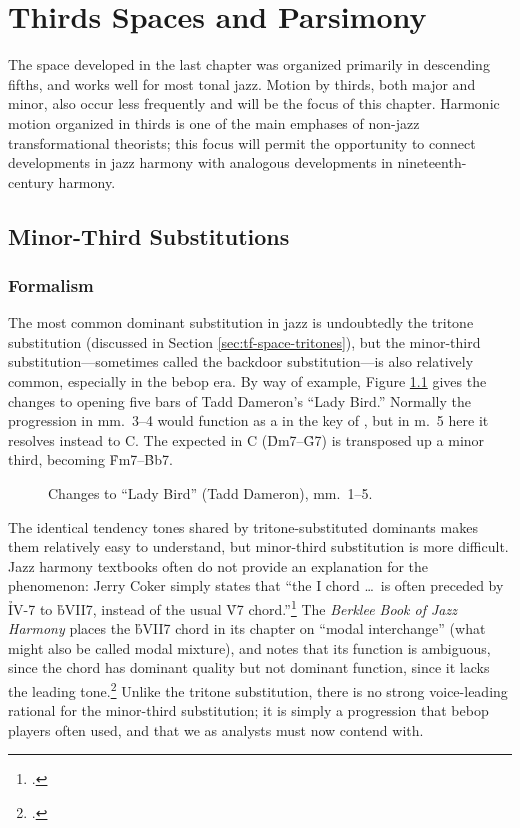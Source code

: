 
\chapter{Thirds Spaces and Parsimony}

The space developed in the last chapter was organized primarily in descending
fifths, and works well for most tonal jazz. Motion by thirds, both major and
minor, also occur less frequently and will be the focus of this chapter.
Harmonic motion organized in thirds is one of the main emphases of non-jazz
transformational theorists; this focus will permit the opportunity to
connect developments in jazz harmony with analogous developments in
nineteenth-century harmony.

\section{Minor-Third Substitutions}
\label{sec:minor-third-subst}

\subsection{Formalism}
\label{sec:m3-formalism}

The most common dominant substitution in jazz is undoubtedly the tritone
substitution (discussed in Section \ref{sec:tf-space-tritones}), but the
minor-third substitution---sometimes called the backdoor substitution---is also
relatively common, especially in the bebop era. By way of example, Figure
\ref{mts:ladybird-changes} gives the changes to opening five bars of Tadd
Dameron's ``Lady Bird.'' Normally the progression in mm.~3--4 would function
as a \tf in the key of \Eflat, but in m.~5 here it resolves instead to C. The
expected \tf in C (\h{Dm7}--\h{G7}) is transposed up a minor third, becoming
\h{Fm7}--\h{Bb7}.

\begin{figure}[tbp]
  \caption{Changes to ``Lady Bird'' (Tadd Dameron), mm.~1--5.}
  \label{mts:ladybird-changes}
\end{figure}

The identical tendency tones shared by tritone-substituted dominants makes
them relatively easy to understand, but minor-third substitution is more
difficult. Jazz harmony textbooks often do not provide an explanation for the
phenomenon: Jerry Coker simply states that ``the I chord \ldots\ is often
preceded by \h{IV-7} to \h{bVII7}, instead of the usual \h{V7}
chord.''\footcite[82]{coker:elements} The \emph{Berklee Book of Jazz Harmony}
places the \h{bVII7} chord in its chapter on ``modal interchange'' (what might
also be called modal mixture), and notes that its function is ambiguous, since
the chord has dominant quality but not dominant function, since it lacks the
leading tone.\footcite[123--24]{berklee:harmony} Unlike the tritone
substitution, there is no strong voice-leading rational for the minor-third
substitution; it is simply a progression that bebop players often used, and
that we as analysts must now contend with.

